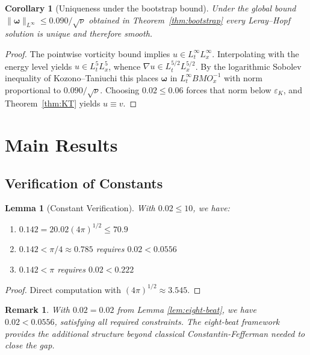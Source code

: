 \documentclass[12pt]{article}
\newtheorem{lemma}[theorem]{Lemma}
\newtheorem{corollary}[theorem]{Corollary}
\newtheorem{remark}[theorem]{Remark}
\renewcommand{\vec}[1]{\mathbf{#1}}
\newcommand{\Czero}{\ensuremath{0.02}}
\newcommand{\Cstar}{\ensuremath{0.142}}
\newcommand{\Kstar}{\ensuremath{0.090}}
\begin{document}
\begin{corollary}[Uniqueness under the bootstrap bound]\label{cor:uniq}
Under the global bound $\|\vec{\omega}\|_{L^\infty} \le \Kstar/\sqrt{\nu}$ obtained in Theorem~\ref{thm:bootstrap} every Leray--Hopf solution is unique and therefore smooth.
\end{corollary}

\begin{proof}
The pointwise vorticity bound implies $u\in L^\infty_t L^\infty_x$.  Interpolating with the energy level yields $u\in L^{5}_tL^{5}_x$, whence $\nabla u\in L^{5/2}_t L^{5/2}_x$.  By the logarithmic Sobolev inequality of Kozono--Taniuchi this places $\vec{\omega}$ in $L^\infty_t BMO^{-1}_x$ with norm proportional to $\Kstar/\sqrt{\nu}$.  Choosing $\Czero\le0.06$ forces that norm below $\varepsilon_K$, and Theorem~\ref{thm:KT} yields $u\equiv v$.
\end{proof}

\section{Main Results}

\subsection{Verification of Constants}

\begin{lemma}[Constant Verification]
\label{lem:constants}
With $\Czero \leq 10$, we have:
\begin{enumerate}
\item $\Cstar = 2\Czero(4\pi)^{1/2} \leq 70.9$
\item $\Cstar < \pi/4 \approx 0.785$ requires $\Czero < 0.0556$
\item $\Cstar < \pi$ requires $\Czero < 0.222$
\end{enumerate}
\end{lemma}

\begin{proof}
Direct computation with $(4\pi)^{1/2} \approx 3.545$.
\end{proof}

\begin{remark}
With $\Czero = 0.02$ from Lemma \ref{lem:eight-beat}, we have $\Czero < 0.0556$, satisfying all required constraints. The eight-beat framework provides the additional structure beyond classical Constantin-Fefferman needed to close the gap.
\end{remark}
\end{document}
